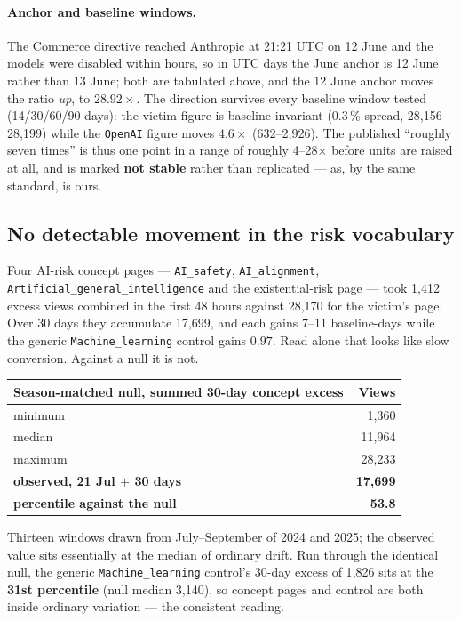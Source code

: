 \documentclass[11pt,a4paper]{article}
\begin{document}
\paragraph{Anchor and baseline windows.} The Commerce directive reached
Anthropic at 21:21 UTC on 12 June and the models were disabled within hours, so
in UTC days the June anchor is 12 June rather than 13 June; both are tabulated
above, and the 12 June anchor moves the ratio \emph{up}, to $28.92\times$. The
direction survives every baseline window tested (14/30/60/90 days): the victim
figure is baseline-invariant (0.3\,\% spread, 28{,}156--28{,}199) while the
\texttt{OpenAI} figure moves $4.6\times$ (632--2{,}926). The published ``roughly
seven times'' is thus one point in a range of roughly 4--28$\times$ before units
are raised at all, and is marked \textbf{not stable} rather than replicated ---
as, by the same standard, is ours.

\subsection{No detectable movement in the risk vocabulary}
\label{sec:null}

Four AI-risk concept pages --- \texttt{AI\_safety}, \texttt{AI\_alignment},
\texttt{Artificial\_general\_intelligence} and the existential-risk page ---
took 1{,}412 excess views combined in the first 48 hours against 28{,}170 for
the victim's page. Over 30 days they accumulate 17{,}699, and each gains 7--11
baseline-days while the generic \texttt{Machine\_learning} control gains $0.97$.
Read alone that looks like slow conversion. Against a null it is not.

\begin{center}
\small
\begin{tabular}{lr}
\toprule
Season-matched null, summed 30-day concept excess & Views \\\midrule
minimum & 1{,}360 \\
median & 11{,}964 \\
maximum & 28{,}233 \\
\textbf{observed, 21 Jul $+$ 30 days} & \textbf{17{,}699} \\
\midrule
\textbf{percentile against the null} & \textbf{53.8} \\
\bottomrule
\end{tabular}
\end{center}

Thirteen windows drawn from July--September of 2024 and 2025; the observed value
sits essentially at the median of ordinary drift. Run through the identical
null, the generic \texttt{Machine\_learning} control's 30-day excess of 1{,}826
sits at the \textbf{31st percentile} (null median 3{,}140), so concept pages and
control are both inside ordinary variation --- the consistent reading.
\end{document}
